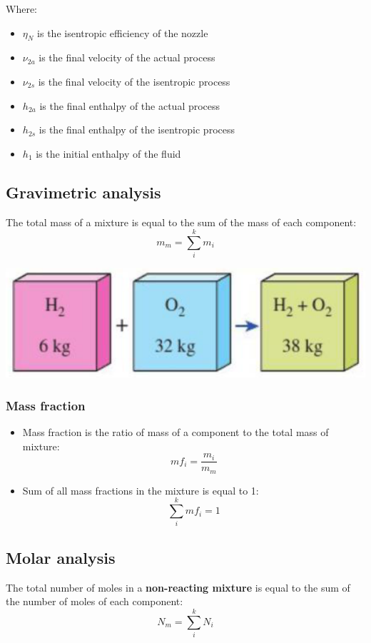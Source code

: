 \documentclass[11pt]{article}
\begin{document}
Where:
\begin{itemize}
\item \(\eta_N\) is the isentropic efficiency of the nozzle
\item \(\nu_{2a}\) is the final velocity of the actual process
\item \(\nu_{2s}\) is the final velocity of the isentropic process
\item \(h_{2a}\) is the final enthalpy of the actual process
\item \(h_{2s}\) is the final enthalpy of the isentropic process
\item \(h_1\) is the initial enthalpy of the fluid
\end{itemize}

\subsection{Gravimetric analysis}
\label{sec:org1d27df4}
The total mass of a mixture is equal to the sum of the mass of each component:
\[m_m = \sum_i^k m_i\]

\begin{center}
\includegraphics[width=.9\linewidth]{./images/gravimetric-analysis.png}
\end{center}

\subsubsection{Mass fraction}
\label{sec:org48dee89}
\begin{itemize}
\item Mass fraction is the ratio of mass of a component to the total mass of mixture:
\[mf_i = \frac{m_i}{m_m}\]
\item Sum of all mass fractions in the mixture is equal to 1:
\[\sum_i^k mf_i = 1\]
\end{itemize}

\subsection{Molar analysis}
\label{sec:org09a9094}
The total number of moles in a \textbf{non-reacting mixture} is equal to the sum of the number of moles of each component:
\[N_m = \sum_i^k N_i\]
\end{document}
